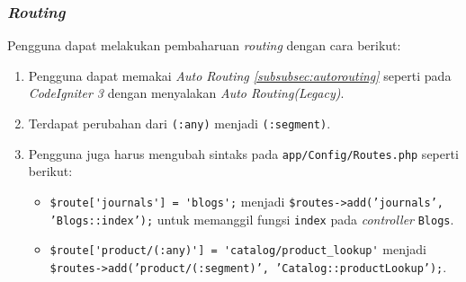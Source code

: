 \subsubsection{\textit{Routing}}

Pengguna dapat melakukan pembaharuan \textit{routing} dengan cara berikut:
\begin{enumerate}
\item Pengguna dapat memakai \textit{Auto Routing \ref{subsubsec:autorouting}} seperti pada \textit{CodeIgniter 3} dengan menyalakan \textit{Auto Routing(Legacy)}.
\item Terdapat perubahan dari \verb|(:any)| menjadi \verb|(:segment)|.
\item Pengguna juga harus mengubah sintaks pada \verb|app/Config/Routes.php| seperti berikut:
	\begin{itemize}
	\item \verb|$route['journals'] = 'blogs';| menjadi \texttt{\$routes->add('journals', 'Blogs::index');} untuk memanggil fungsi \texttt{index} pada \textit{controller} \texttt{Blogs}.
	\item \verb|$route['product/(:any)'] = 'catalog/product_lookup'| menjadi \texttt{\$routes->add('product/(:segment)', 'Catalog::productLookup');}.
	\end{itemize}
\end{enumerate}

